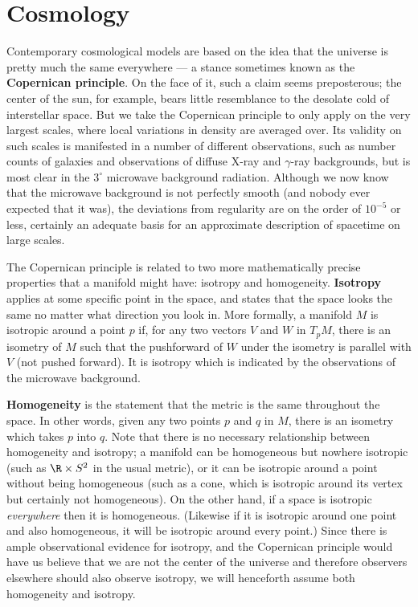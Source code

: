\documentclass[12pt]{article}
\begin{document}
\setcounter{section}{7}
\section{Cosmology}

Contemporary cosmological models are based on the idea that the
universe is pretty much the same everywhere --- a stance sometimes
known as the {\bf Copernican principle}.  On the face of it, such
a claim seems preposterous; the center of the sun, for example, 
bears little resemblance to the desolate cold of interstellar
space.  But we take the Copernican principle to only apply on
the very largest scales, where local variations in density are
averaged over.  Its validity on such scales is 
manifested in a number of different observations, such as number counts
of galaxies and observations of diffuse X-ray and $\gamma$-ray
backgrounds, but is most clear in the $3^\circ$ microwave background
radiation.  Although we now know that the microwave background is not
perfectly smooth (and nobody ever expected that it was), the 
deviations from regularity are on the order of $10^{-5}$ or less,
certainly an adequate basis for an approximate description of 
spacetime on large scales.

The Copernican principle is related to two more mathematically
precise properties that a manifold might have: isotropy and homogeneity.
{\bf Isotropy} applies at some specific point in the space, and
states that the space looks the same no matter what direction you
look in.  More formally, a manifold $M$ is isotropic around a point
$p$ if, for any two vectors $V$ and $W$ in $T_pM$, there is an
isometry of $M$ such that the pushforward of $W$ under the isometry
is parallel with $V$ (not pushed forward).
It is isotropy which is indicated by the observations of the
microwave background.

{\bf Homogeneity} is the statement that the metric is the same
throughout the space.  In other words, given any two points $p$ and
$q$ in $M$, there is an isometry which takes $p$ into $q$.
Note that there is no necessary relationship between homogeneity
and isotropy; a manifold can be homogeneous but nowhere isotropic
(such as $\R\times S^2$ in the usual metric), or it can be isotropic
around a point without being homogeneous (such as a cone, which is
isotropic around its vertex but certainly not homogeneous).  On the
other hand, if a space is isotropic {\it everywhere} then it is
homogeneous.  (Likewise if it is isotropic around one point and
also homogeneous, it will be isotropic around every point.)
Since there is ample observational evidence for 
isotropy, and the Copernican principle would have us believe that we
are not the center of the universe and therefore observers elsewhere
should also observe isotropy, we will henceforth assume both
homogeneity and isotropy.
\end{document}
